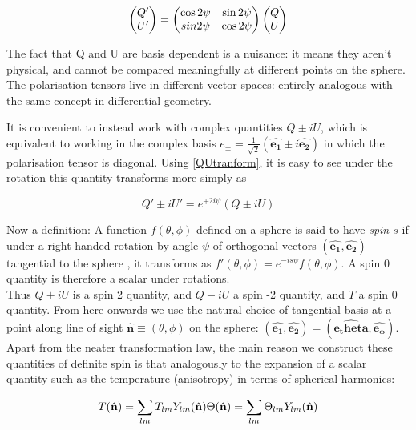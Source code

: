 \documentclass[a4paper,10pt]{article}
\renewcommand{\v}[1]{\mathbf{#1}}
\newcommand{\unit}[1]{\hat{\v{#1}}}
\begin{document}
\begin{equation}
\begin{pmatrix}
Q'\\
U' 
\end{pmatrix}
=
\begin{pmatrix}
\cos{2\psi} & \sin{2\psi}\\ 
\-sin{2\psi} & \cos{2\psi}
\end{pmatrix}
\begin{pmatrix}
Q\\
U
\end{pmatrix}
\label{QUtranform}
\end{equation}

The fact that Q and U are basis dependent is a nuisance: it means they aren't physical, and cannot be compared meaningfully at different points on the sphere. The polarisation tensors live in different vector spaces: entirely analogous with the same concept in differential geometry. 

It is convenient to instead work with complex quantities $Q\pm iU$, which is equivalent to working in the complex basis $e_\pm = \frac{1}{\sqrt{2}}(\unit{e_1} \pm i\unit{e_2})$ in which the polarisation tensor is diagonal. Using \ref{QUtranform}, it is easy to see under the rotation this quantity transforms more simply as

\begin{equation}
Q'\pm iU' = e^{\mp 2i\psi}(Q\pm iU)
\end{equation}

Now a definition: A function $f(\theta, \phi)$ defined on a sphere is said to have \textit{spin $s$} if under a right handed rotation by angle $\psi$ of orthogonal vectors $(\unit{e_1}, \unit{e_2})$ tangential to the sphere , it transforms as $f'(\theta, \phi) = e^{-is\psi}f(\theta, \phi)$. A spin 0 quantity is therefore a scalar under rotations.\\

Thus $Q+iU$ is a spin 2 quantity, and $Q-iU$ a spin -2 quantity, and $T$ a spin 0 quantity. From here onwards we use the natural choice of tangential basis at a point along line of sight $\unit{n} \equiv (\theta, \phi)$ on the sphere: $(\unit{e_1}, \unit{e_2}) = (\unit{e_theta}, \unit{e_\phi})$. Apart from the neater transformation law, the main reason we construct these quantities of definite spin is that analogously to the expansion of a scalar quantity such as the temperature (anisotropy) in terms of spherical harmonics:

\begin{equation}
T(\unit{n}) = \sum_{lm} T_{lm}Y_{lm}(\unit{n})\\
\Theta(\unit{n}) = \sum_{lm} \Theta_{lm}Y_{lm}(\unit{n})
\end{equation}
\end{document}
